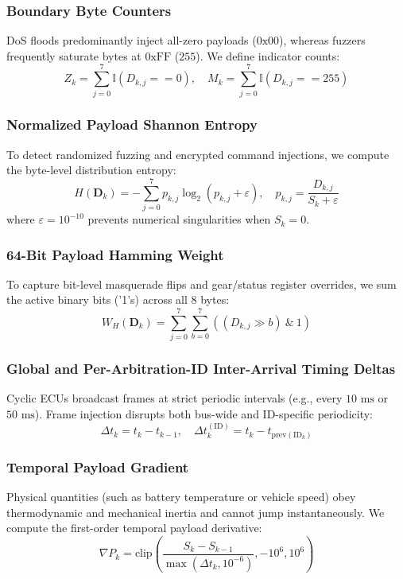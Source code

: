 \documentclass[conference]{IEEEtran}
\begin{document}
\subsubsection{Boundary Byte Counters}
DoS floods predominantly inject all-zero payloads ($0\text{x}00$), whereas fuzzers frequently saturate bytes at $0\text{xFF}$ ($255$). We define indicator counts:
\begin{equation}
    Z_k = \sum_{j=0}^{7} \mathbb{I}(D_{k,j} == 0), \quad M_k = \sum_{j=0}^{7} \mathbb{I}(D_{k,j} == 255)
\end{equation}

\subsubsection{Normalized Payload Shannon Entropy}
To detect randomized fuzzing and encrypted command injections, we compute the byte-level distribution entropy:
\begin{equation}
    H(\mathbf{D}_k) = -\sum_{j=0}^{7} p_{k,j} \log_2 \left( p_{k,j} + \varepsilon \right), \quad p_{k,j} = \frac{D_{k,j}}{S_k + \varepsilon}
\end{equation}
where $\varepsilon = 10^{-10}$ prevents numerical singularities when $S_k = 0$.

\subsubsection{64-Bit Payload Hamming Weight}
To capture bit-level masquerade flips and gear/status register overrides, we sum the active binary bits ('1's) across all 8 bytes:
\begin{equation}
    W_H(\mathbf{D}_k) = \sum_{j=0}^{7} \sum_{b=0}^{7} \left( (D_{k,j} \gg b) \ \& \ 1 \right)
\end{equation}

\subsubsection{Global and Per-Arbitration-ID Inter-Arrival Timing Deltas}
Cyclic ECUs broadcast frames at strict periodic intervals (e.g., every $10\text{ ms}$ or $50\text{ ms}$). Frame injection disrupts both bus-wide and ID-specific periodicity:
\begin{equation}
    \Delta t_k = t_k - t_{k-1}, \quad \Delta t_k^{(\text{ID})} = t_k - t_{\text{prev}(\text{ID}_k)}
\end{equation}

\subsubsection{Temporal Payload Gradient}
Physical quantities (such as battery temperature or vehicle speed) obey thermodynamic and mechanical inertia and cannot jump instantaneously. We compute the first-order temporal payload derivative:
\begin{equation}
    \nabla P_k = \text{clip}\left( \frac{S_k - S_{k-1}}{\max(\Delta t_k, 10^{-6})}, -10^6, 10^6 \right)
\end{equation}
\end{document}
